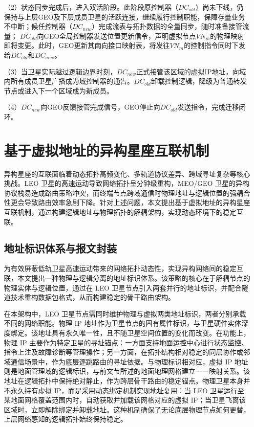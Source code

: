 \documentclass[print, master, vlined]{DissertUESTC}
\begin{document}
    （2）状态同步完成后，进入双活阶段。此阶段原控制器（$DC_{old}$）尚未下线，仍保持与上层GEO及下层成员卫星的活跃连接，继续履行控制职能，保障存量业务不中断；候任控制器（$DC_{new}$）完成流表与拓扑数据的全量同步，随时准备接管流量；
    $DC_{old}$向GEO全局控制器发送位置更新信令，声明虚拟节点$VN_m$的物理映射即将变更。此时，GEO更新其南向接口映射表，将发往$VN_m$的控制指令同时下发给$DC_{old}$和$DC_{new}$。

    （3）当卫星实际越过逻辑边界时刻，$DC_{new}$正式接管该区域的虚拟IP地址，向域内所有成员卫星广播成为域控制器的通告。$DC_{old}$卸载控制逻辑，降级为普通转发节点或进入下一个区域成为新成员。
    
    （4）$DC_{new}$向GEO反馈接管完成信号，GEO停止向$DC_{old}$发送指令，完成迁移闭环。

    \section{基于虚拟地址的异构星座互联机制}
    异构星座的互联面临着动态拓扑高频变化、多轨道协议差异、跨域寻址复杂等核心挑战。LEO 卫星的高速运动导致网络拓扑呈分钟级重构，MEO/GEO 卫星的异构协议栈易造成路由策略冲突，而终端节点跨域通信时物理地址与逻辑位置的强耦合性更会导致路由效率急剧下降。针对上述问题，本文提出基于虚拟地址的异构星座互联机制，通过构建逻辑地址与物理拓扑的解耦架构，实现动态环境下的稳定互联。
    
    \subsection{地址标识体系与报文封装}
    为有效屏蔽低轨卫星高速运动带来的网络拓扑动态性，实现异构网络间的稳定互联，本文提出一种物理与逻辑分离的地址标识体系。该策略的核心在于解耦节点的物理实体与逻辑位置，通过在 LEO 卫星节点引入两套并行的地址标识，并配合隧道技术重构数据包格式，从而构建稳定的骨干路由架构。
    
    在本架构中，LEO 卫星节点需同时维护物理与虚拟两类地址标识，两者分别承载不同的网络职能。物理 IP 地址作为卫星节点的固有属性标识，与卫星硬件实体深度绑定。该地址具有永久唯一性，且不随卫星空间位置的变化而改变。在功能上，物理 IP 主要作为特定卫星的寻址锚点：一方面支持地面运控中心进行状态监控、指令上注及故障诊断等管理操作；另一方面，在拓扑结构相对稳定的同层协作或邻域通信场景中，作为底层逐跳路由的寻址依据。与物理标识相对应，虚拟 IP 地址则是地面管理域的逻辑标识，与前文节所述的地面地理网格建立一一映射关系。该地址在逻辑拓扑中保持绝对静止，作为跨层骨干路由的稳定锚点。物理卫星本身并不永久持有虚拟 IP，而是采用动态绑定机制实现地址复用：当 LEO 卫星运行至某地面网格覆盖范围内时，自动获取并加载该网格对应的虚拟 IP；当卫星飞离该区域时，立即解除绑定并卸载地址。这种机制确保了无论底层物理节点如何更替，上层网络感知的逻辑拓扑始终保持稳定。
\end{document}
